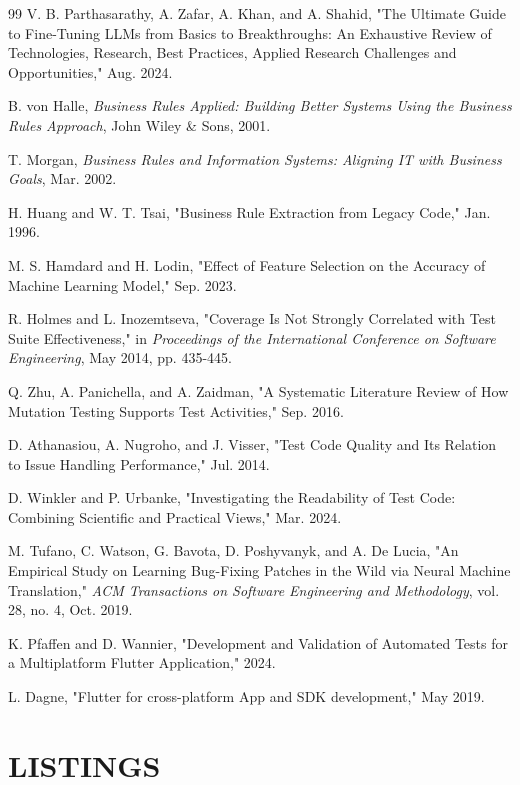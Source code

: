\documentclass[12pt, oneside]{report}
\makeatletter
\newcommand\AppendixName{Appendix}
\let\oldappendix\appendix
\renewcommand{\appendix}{%
  \oldappendix
  \renewcommand{\chaptername}{\AppendixName}  \renewcommand{\thechapter}{\@Alph\c@chapter}}
\makeatother
\begin{document}
\begin{thebibliography}{99}
V. B. Parthasarathy, A. Zafar, A. Khan, and A. Shahid, "The Ultimate Guide to Fine-Tuning LLMs from Basics to Breakthroughs: An Exhaustive Review of Technologies, Research, Best Practices, Applied Research Challenges and Opportunities," Aug. 2024.

B. von Halle, \textit{Business Rules Applied: Building Better Systems Using the Business Rules Approach}, John Wiley \& Sons, 2001.

T. Morgan, \textit{Business Rules and Information Systems: Aligning IT with Business Goals}, Mar. 2002.

H. Huang and W. T. Tsai, "Business Rule Extraction from Legacy Code," Jan. 1996.

M. S. Hamdard and H. Lodin, "Effect of Feature Selection on the Accuracy of Machine Learning Model," Sep. 2023.

R. Holmes and L. Inozemtseva, "Coverage Is Not Strongly Correlated with Test Suite Effectiveness," in \textit{Proceedings of the International Conference on Software Engineering}, May 2014, pp. 435-445.

Q. Zhu, A. Panichella, and A. Zaidman, "A Systematic Literature Review of How Mutation Testing Supports Test Activities," Sep. 2016.

D. Athanasiou, A. Nugroho, and J. Visser, "Test Code Quality and Its Relation to Issue Handling Performance," Jul. 2014.

D. Winkler and P. Urbanke, "Investigating the Readability of Test Code: Combining Scientific and Practical Views," Mar. 2024.

M. Tufano, C. Watson, G. Bavota, D. Poshyvanyk, and A. De Lucia, "An Empirical Study on Learning Bug-Fixing Patches in the Wild via Neural Machine Translation," \textit{ACM Transactions on Software Engineering and Methodology}, vol. 28, no. 4, Oct. 2019.

K. Pfaffen and D. Wannier, "Development and Validation of Automated Tests for a Multiplatform Flutter Application," 2024.

L. Dagne, "Flutter for cross-platform App and SDK development," May 2019.

\end{thebibliography}

\appendix
\chapter{LISTINGS}

\end{document}
